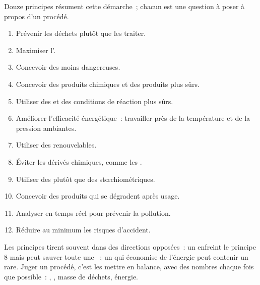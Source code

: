 Douze principes résument cette démarche~; chacun est une question à
poser à propos d'un procédé.
\begin{enumerate}
  \item Prévenir les déchets plutôt que les traiter.
  \item Maximiser l'.
  \item Concevoir des  moins dangereuses.
  \item Concevoir des produits chimiques et des produits plus sûrs.
  \item Utiliser des  et des conditions de réaction plus sûrs.
  \item Améliorer l'efficacité énergétique~: travailler près de la
        température et de la pression ambiantes.
  \item Utiliser des  renouvelables.
  \item Éviter les dérivés chimiques, comme les .
  \item Utiliser des  plutôt que des 
        stœchiométriques.
  \item Concevoir des produits qui se dégradent après usage.
  \item Analyser en temps réel pour prévenir la pollution.
  \item Réduire au minimum les risques d'accident.
\end{enumerate}

\begin{remark}\label{rem:g12:synthesis-strategy:principles}
Les principes tirent souvent dans des directions opposées~: un  enfreint le principe 8 mais peut sauver toute une ~;
un  qui économise de l'énergie peut contenir un  rare.
Juger un procédé, c'est les mettre en balance, avec des nombres chaque
fois que possible~: , , masse de déchets,
énergie.
\end{remark}

